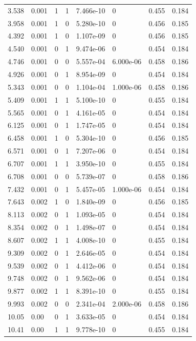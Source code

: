 \documentclass[preview]{standalone}
\begin{document}
{{\begin{tabular}{L{1.2cm}C{1.2cm} C{0.3cm}C{0.5cm} C{1.4cm}C{1.4cm} C{1.4cm}C{1.4cm}}
  3.538  &  0.001  & 1     &  1 &  7.466e-10  & 0  & 0.455 &  0.184   \\ 
  3.958  &  0.001  & 1     &  0 &  5.280e-10  & 0  & 0.456 &  0.185   \\ 
  4.392  &  0.001  & 1     &  0 &  1.107e-09  & 0  & 0.456 &  0.185   \\ 
  4.540  &  0.001  & 0     &  1 &  9.474e-06  & 0  & 0.454 &  0.184   \\ 
  4.746  &  0.001  & 0     &  0 &  5.557e-04  & 6.000e-06  & 0.458 &  0.186   \\ 
  4.926  &  0.001  & 0     &  1 &  8.954e-09  & 0  & 0.454 &  0.184   \\ 
  5.343  &  0.001  & 0     &  0 &  1.104e-04  & 1.000e-06  & 0.458 &  0.186   \\ 
  5.409  &  0.001  & 1     &  1 &  5.100e-10  & 0  & 0.455 &  0.184   \\ 
  5.565  &  0.001  & 0     &  1 &  4.161e-05  & 0  & 0.454 &  0.184   \\ 
  6.125  &  0.001  & 0     &  1 &  1.747e-05  & 0  & 0.454 &  0.184   \\ 
  6.458  &  0.001  & 1     &  0 &  5.304e-10  & 0  & 0.456 &  0.185   \\ 
  6.571  &  0.001  & 0     &  1 &  7.207e-06  & 0  & 0.454 &  0.184   \\ 
  6.707  &  0.001  & 1     &  1 &  3.950e-10  & 0  & 0.455 &  0.184   \\ 
  6.708  &  0.001  & 0     &  0 &  5.739e-07  & 0  & 0.458 &  0.186   \\ 
  7.432  &  0.001  & 0     &  1 &  5.457e-05  & 1.000e-06  & 0.454 &  0.184   \\ 
  7.643  &  0.002  & 1     &  0 &  1.840e-09  & 0  & 0.456 &  0.185   \\ 
  8.113  &  0.002  & 0     &  1 &  1.093e-05  & 0  & 0.454 &  0.184   \\ 
  8.354  &  0.002  & 0     &  1 &  1.498e-07  & 0  & 0.454 &  0.184   \\ 
  8.607  &  0.002  & 1     &  1 &  4.008e-10  & 0  & 0.455 &  0.184   \\ 
  9.309  &  0.002  & 0     &  1 &  2.646e-05  & 0  & 0.454 &  0.184   \\ 
  9.539  &  0.002  & 0     &  1 &  4.412e-06  & 0  & 0.454 &  0.184   \\ 
  9.748  &  0.002  & 0     &  1 &  9.562e-06  & 0  & 0.454 &  0.184   \\ 
  9.877  &  0.002  & 1     &  1 &  8.391e-10  & 0  & 0.455 &  0.184   \\ 
  9.993  &  0.002  & 0     &  0 &  2.341e-04  & 2.000e-06  & 0.458 &  0.186   \\ 
  10.05  &  0.00  & 0     &  1 &  3.633e-05  & 0  & 0.454 &  0.184   \\ 
  10.41  &  0.00  & 1     &  1 &  9.778e-10  & 0  & 0.455 &  0.184   \\ 
\hline 
\end{tabular} 

}}
\end{document}
